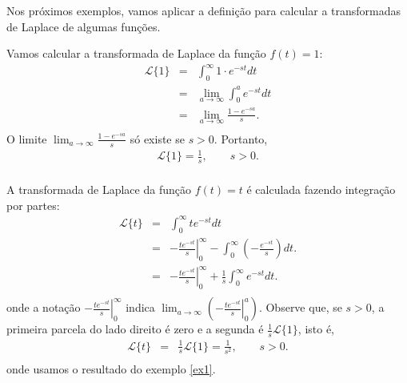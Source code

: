 Nos próximos exemplos, vamos aplicar a definição para calcular a transformadas de Laplace de algumas funções.
\begin{ex}\label{ex1} Vamos calcular a transformada de Laplace da função $f(t)=1$:
\begin{eqnarray*}
\mathcal{L}\{1\}&=&\int_0^\infty 1\cdot e^{-st}dt\\
&=&\lim_{a\to\infty}\int_0^a  e^{-st}dt\\
&=&\lim_{a\to\infty} \frac{1-e^{-sa}}{s}.\\
\end{eqnarray*}
O limite $\displaystyle\lim_{a\to\infty}\frac{1-e^{-sa}}{s}$ só existe se $s>0$. Portanto,
\begin{eqnarray*}
\mathcal{L}\{1\}=\frac{1}{s},\qquad s>0.\\
\end{eqnarray*}
\end{ex}
\begin{ex}\label{ex2} A transformada de Laplace da função $f(t)=t$ é calculada fazendo integração por partes:
\begin{eqnarray*}
\mathcal{L}\{t\}&=&\int_0^\infty te^{-st}dt\\
&=&\left.-\frac{te^{-st}}{s}\right|_0^\infty-\int_0^\infty \left(-\frac{e^{-st}}{s}\right)dt .\\
&=&\left.-\frac{te^{-st}}{s}\right|_0^\infty+\frac{1}{s}\int_0^\infty e^{-st}dt .\\
\end{eqnarray*}
onde a notação $\displaystyle\left.-\frac{te^{-st}}{s}\right|_0^\infty$ indica $\displaystyle\lim_{a\to\infty}\left(\left.-\frac{te^{-st}}{s} \right|_0^a\right)$. Observe que, se $s>0$, a primeira parcela do lado direito é zero e a segunda é $\frac{1}{s}\mathcal{L}\{1\}$, isto é,
\begin{eqnarray*}
\mathcal{L}\{t\}&=&\frac{1}{s}\mathcal{L}\{1\}=\frac{1}{s^2},\qquad s>0.\\
\end{eqnarray*}
onde usamos o resultado do exemplo \ref{ex1}.
\end{ex}
